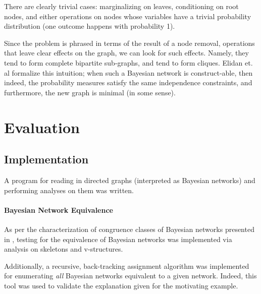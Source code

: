\documentclass{article}
\begin{document}
	There are clearly trivial cases: marginalizing on leaves, conditioning on root nodes, and either operations on nodes whose variables have a trivial probability distribution (one outcome happens with probability 1).
	
	Since the problem is phrased in terms of the result of a node removal, operations that leave clear effects on the graph, we can look for such effects.
	Namely, they tend to form complete bipartite sub-graphs, and tend to form cliques.
	Elidan et. al\cite{elidanDiscovering2001} formalize this intuition; when such a Bayesian network is construct-able, then indeed, the probability measures satisfy the same independence constraints, and furthermore, the new graph is minimal (in some sense).
	
	
	
	
	
	
	
	\section{Evaluation}
	\label{evaluation}
	
	\subsection{Implementation}
	
	A program for reading in directed graphs (interpreted as Bayesian networks) and performing analyses on them was written.
	
	\paragraph{Bayesian Network Equivalence}
	As per the characterization of congruence classes of Bayesian networks presented in \cite{verma2013equivalence,chickering2013transformational}, testing for the equivalence of Bayesian networks was implemented via analysis on skeletons and v-structures.
	
	Additionally, a recursive, back-tracking assignment algorithm was implemented for enumerating \emph{all} Bayesian networks equivalent to a given network.
	Indeed, this tool was used to validate the explanation given for the motivating example.
	
\end{document}
